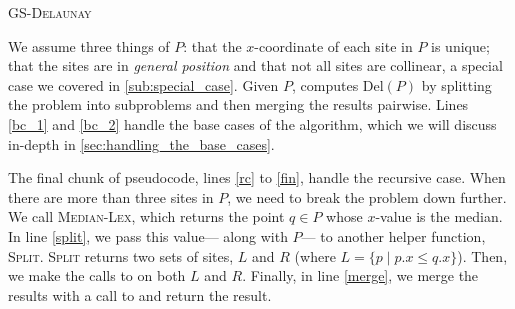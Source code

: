 \documentclass[12pt,twoside]{reedthesis}
\makeatletter
\let\OldStatex\Statex
\renewcommand{\Statex}[1][3]{%
  \setlength\@tempdima{\algorithmicindent}%
  \OldStatex\hskip\dimexpr#1\@tempdima\relax}
\makeatother
\begin{document}
    \begin{algorithm}[H]
    \caption{\textsc{GS-Delaunay}}\label{divconq_del}
    \end{algorithm}

    We assume three things of $P$: that the $x$-coordinate of each site in $P$ is unique; that the sites are in \emph{general position} and that not all sites are collinear, a special case we covered in \cref{sub:special_case}. Given $P$,  computes $\mbox{Del}(P)$ by splitting the problem into subproblems and then merging the results pairwise. Lines \ref{bc_1} and \ref{bc_2} handle the base cases of the algorithm, which we will discuss in-depth in \cref{sec:handling_the_base_cases}. \par

    The final chunk of pseudocode, lines \ref{rc} to \ref{fin}, handle the recursive case. When there are more than three sites in $P$, we need to break the problem down further. We call \textsc{Median-Lex}, which returns the point $q \in P$ whose $x$-value is the median. In line \ref{split}, we pass this value--- along with $P$--- to another helper function, \textsc{Split}. \textsc{Split} returns two sets of sites, $L$ and $R$ (where $L = \{p \mid p.x \leq q.x\}$). Then, we make the calls to  on both $L$ and $R$. Finally, in line \ref{merge}, we merge the results with a call to  and return the result.\par
\end{document}
